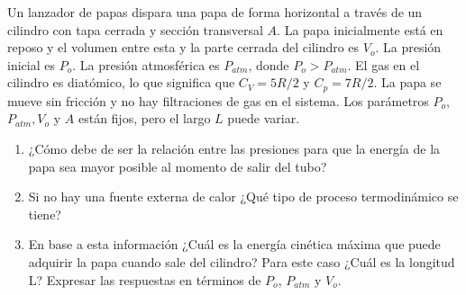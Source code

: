 \begin{mdframed}[style=warning]
	\begin{ejercicio}
		Un lanzador de papas dispara una papa de forma horizontal a través de un cilindro con tapa cerrada y sección transversal $A$. La papa inicialmente está en reposo y el volumen entre esta y la parte cerrada del cilindro es $V_o$. La presión inicial es $P_o$. La presión atmosférica es $P_{atm}$, donde $P_o > P_{atm}$. El gas en el cilindro es diatómico, lo que significa que $C_V = 5R/2$ y $C_p = 7R/2$. La papa se mueve sin fricción y no hay filtraciones de gas en el sistema. Los parámetros $P_o$, $P_{atm}, V_o$ y $A$ están fijos, pero el largo $L$ puede variar.
		\begin{enumerate}
			\item ¿Cómo debe de ser la relación entre las presiones para que la energía de la papa sea mayor posible al momento de salir del tubo?
			\item Si no hay una fuente externa de calor ¿Qué tipo de proceso termodinámico se tiene?
			\item En base a esta información ¿Cuál es la energía cinética máxima que puede adquirir la papa cuando sale del cilindro? Para este caso ¿Cuál es la longitud L? Expresar las respuestas en términos de $P_o$, $P_{atm}$ y $V_o$.
		\end{enumerate}
	\end{ejercicio}
\end{mdframed}

















